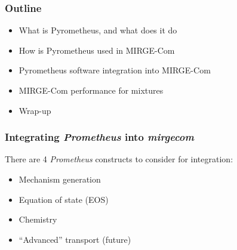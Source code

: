 \def\CC{{C\nolinebreak[4]\hspace{-.05em}\raisebox{.4ex}{\tiny\bf ++}}}


\begin{frame}\frametitle{Outline}
\begin{itemize}
\item What is Pyrometheus, and what does it do
\item How is Pyrometheus used in MIRGE-Com
\item Pyrometheus software integration into MIRGE-Com
\item MIRGE-Com performance for mixtures
\item Wrap-up
\end{itemize}
\end{frame}

\begin{frame}\frametitle{Integrating \textit{Prometheus} into \textit{mirgecom}}
There are 4 \textit{Prometheus} constructs to consider for integration:
\begin{itemize}
\item Mechanism generation
\item Equation of state (EOS)
\item Chemistry
\item ``Advanced'' transport (future)
\end{itemize}
\end{frame}

